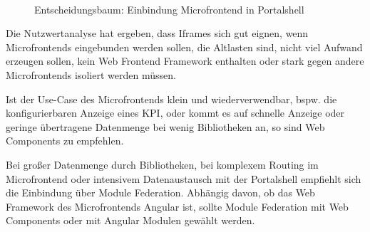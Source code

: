 \newpage
\begin{figure}[hbt!]
	\centering
	\begin{minipage}[t]{0.95\textwidth}	
		\caption{Entscheidungsbaum: Einbindung Microfrontend in Portalshell}
		\\ %
		\label{fig:Entscheidungsbaum}
	\end{minipage}
\end{figure}

Die Nutzwertanalyse hat ergeben, dass Iframes sich gut eignen, wenn Microfrontends eingebunden werden sollen, die Altlasten sind, nicht viel Aufwand erzeugen sollen, kein Web Frontend Framework enthalten oder stark gegen andere Microfrontends isoliert werden müssen. 

Ist der Use-Case des Microfrontends klein und wiederverwendbar, bspw. die konfigurierbaren Anzeige eines \gls{KPI}, oder kommt es auf schnelle Anzeige oder geringe übertragene Datenmenge bei wenig Bibliotheken an, so sind Web Components zu empfehlen.

Bei großer Datenmenge durch Bibliotheken, bei komplexem Routing im Microfrontend oder intensivem Datenaustausch mit der Portalshell empfiehlt sich die Einbindung über Module Federation. Abhängig davon, ob das Web Framework des Microfrontends Angular ist, sollte Module Federation mit Web Components oder mit Angular Modulen gewählt werden.